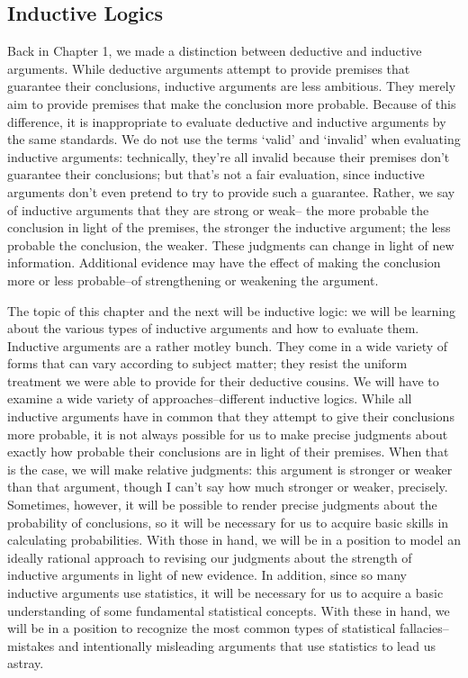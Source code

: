 \subsection{Inductive Logics}
Back in Chapter 1, we made a distinction between deductive and inductive arguments. While
deductive arguments attempt to provide premises that guarantee their conclusions, inductive
arguments are less ambitious. They merely aim to provide premises that make the conclusion more
probable. Because of this difference, it is inappropriate to evaluate deductive and inductive
arguments by the same standards. We do not use the terms `valid' and `invalid' when evaluating
inductive arguments: technically, they're all invalid because their premises don't guarantee their
conclusions; but that's not a fair evaluation, since inductive arguments don't even pretend to try
to provide such a guarantee. Rather, we say of inductive arguments that they are strong or weak--
the more probable the conclusion in light of the premises, the stronger the inductive argument; the
less probable the conclusion, the weaker. These judgments can change in light of new information.
Additional evidence may have the effect of making the conclusion more or less probable--of
strengthening or weakening the argument.

The topic of this chapter and the next will be inductive logic: we will be learning about the various
types of inductive arguments and how to evaluate them. Inductive arguments are a rather motley
bunch. They come in a wide variety of forms that can vary according to subject matter; they resist
the uniform treatment we were able to provide for their deductive cousins. We will have to examine
a wide variety of approaches--different inductive logics. While all inductive arguments have in
common that they attempt to give their conclusions more probable, it is not always possible for us
to make precise judgments about exactly how probable their conclusions are in light of their
premises. When that is the case, we will make relative judgments: this argument is stronger or
weaker than that argument, though I can't say how much stronger or weaker, precisely. Sometimes,
however, it will be possible to render precise judgments about the probability of conclusions, so it
will be necessary for us to acquire basic skills in calculating probabilities. With those in hand, we
will be in a position to model an ideally rational approach to revising our judgments about the
strength of inductive arguments in light of new evidence. In addition, since so many inductive
arguments use statistics, it will be necessary for us to acquire a basic understanding of some
fundamental statistical concepts. With these in hand, we will be in a position to recognize the most
common types of statistical fallacies--mistakes and intentionally misleading arguments that use
statistics to lead us astray.

